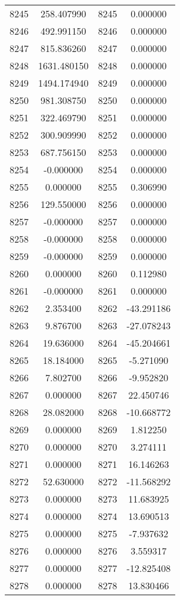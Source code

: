 \documentclass[12pt]{article}
\begin{document}
\begin{longtable}{@{}cccc@{}}
8245 & 258.407990 & 8245 & 0.000000 \\
8246 & 492.991150 & 8246 & 0.000000 \\
8247 & 815.836260 & 8247 & 0.000000 \\
8248 & 1631.480150 & 8248 & 0.000000 \\
8249 & 1494.174940 & 8249 & 0.000000 \\
8250 & 981.308750 & 8250 & 0.000000 \\
8251 & 322.469790 & 8251 & 0.000000 \\
8252 & 300.909990 & 8252 & 0.000000 \\
8253 & 687.756150 & 8253 & 0.000000 \\
8254 & -0.000000 & 8254 & 0.000000 \\
8255 & 0.000000 & 8255 & 0.306990 \\
8256 & 129.550000 & 8256 & 0.000000 \\
8257 & -0.000000 & 8257 & 0.000000 \\
8258 & -0.000000 & 8258 & 0.000000 \\
8259 & -0.000000 & 8259 & 0.000000 \\
8260 & 0.000000 & 8260 & 0.112980 \\
8261 & -0.000000 & 8261 & 0.000000 \\
8262 & 2.353400 & 8262 & -43.291186 \\
8263 & 9.876700 & 8263 & -27.078243 \\
8264 & 19.636000 & 8264 & -45.204661 \\
8265 & 18.184000 & 8265 & -5.271090 \\
8266 & 7.802700 & 8266 & -9.952820 \\
8267 & 0.000000 & 8267 & 22.450746 \\
8268 & 28.082000 & 8268 & -10.668772 \\
8269 & 0.000000 & 8269 & 1.812250 \\
8270 & 0.000000 & 8270 & 3.274111 \\
8271 & 0.000000 & 8271 & 16.146263 \\
8272 & 52.630000 & 8272 & -11.568292 \\
8273 & 0.000000 & 8273 & 11.683925 \\
8274 & 0.000000 & 8274 & 13.690513 \\
8275 & 0.000000 & 8275 & -7.937632 \\
8276 & 0.000000 & 8276 & 3.559317 \\
8277 & 0.000000 & 8277 & -12.825408 \\
8278 & 0.000000 & 8278 & 13.830466 \\

\end{longtable}
\end{document}
